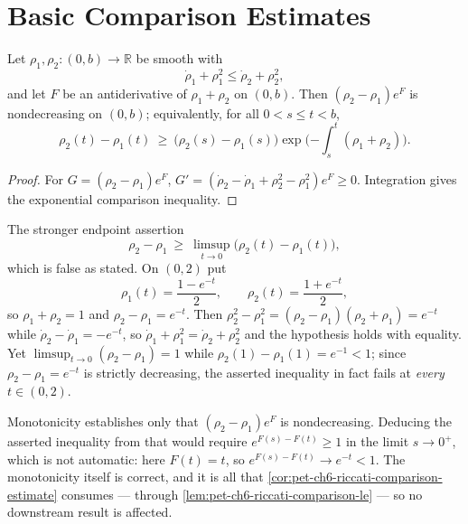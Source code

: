 \section{Basic Comparison Estimates}

\begin{proposition}
  \label{prop:pet-ch6-riccati-comparison-principle}
  \leanok
  Let $\rho_1,\rho_2:(0,b)\to\mathbb{R}$ be smooth with
  \[
    \dot\rho_1+\rho_1^2\le\dot\rho_2+\rho_2^2 ,
  \]
  and let $F$ be an antiderivative of $\rho_1+\rho_2$ on $(0,b)$. Then
  $(\rho_2-\rho_1)e^{F}$ is nondecreasing on $(0,b)$; equivalently, for all
  $0<s\le t<b$,
  \[
    \rho_2(t)-\rho_1(t)\ \ge\ \big(\rho_2(s)-\rho_1(s)\big)
      \exp\Big({-\int_s^t(\rho_1+\rho_2)}\Big).
  \]
\end{proposition}
\begin{proof}
  \leanok
  \sketch
  For \(G=(\rho_2-\rho_1)e^F\), \(G'=(\dot\rho_2-\dot\rho_1+\rho_2^2-\rho_1^2)e^F\ge0\). Integration gives the exponential comparison inequality.
\end{proof}

\begin{remark}
  \label{rem:pet-ch6-riccati-principle-correction}
  \leanok
  The stronger endpoint assertion
  \[
    \rho_2-\rho_1\ \ge\ \limsup_{t\to0}\big(\rho_2(t)-\rho_1(t)\big),
  \]
  which is false as stated. On $(0,2)$ put
  \[
    \rho_1(t)=\frac{1-e^{-t}}{2},\qquad \rho_2(t)=\frac{1+e^{-t}}{2},
  \]
  so $\rho_1+\rho_2=1$ and $\rho_2-\rho_1=e^{-t}$. Then
  $\rho_2^2-\rho_1^2=(\rho_2-\rho_1)(\rho_2+\rho_1)=e^{-t}$ while
  $\dot\rho_2-\dot\rho_1=-e^{-t}$, so $\dot\rho_1+\rho_1^2=\dot\rho_2+\rho_2^2$
  and the hypothesis holds with equality. Yet
  $\limsup_{t\to0}(\rho_2-\rho_1)=1$ while $\rho_2(1)-\rho_1(1)=e^{-1}<1$; since
  $\rho_2-\rho_1=e^{-t}$ is strictly decreasing, the asserted inequality in fact
  fails at \emph{every} $t\in(0,2)$.

  Monotonicity establishes only that
  $(\rho_2-\rho_1)e^{F}$ is nondecreasing. Deducing the asserted inequality from
  that would require $e^{F(s)-F(t)}\ge1$ in the limit $s\to0^+$, which is not
  automatic: here $F(t)=t$, so $e^{F(s)-F(t)}\to e^{-t}<1$. The monotonicity
  itself is correct, and it is all that
  \cref{cor:pet-ch6-riccati-comparison-estimate} consumes — through
  \cref{lem:pet-ch6-riccati-comparison-le} — so no downstream result is affected.
\end{remark}

